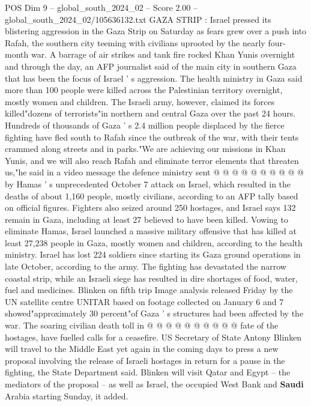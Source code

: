 \begin{textsample}{POS Dim 9 – global\_south\_2024\_02 – Score 2.00 – global\_south\_2024\_02/105636132.txt}  \label{ex:f9_pos_095}
GAZA STRIP : Israel pressed its blistering aggression in the Gaza Strip on Saturday as fears grew over a push into Rafah, the southern city teeming with civilians uprooted by the nearly four-month war.
A barrage of air strikes and tank fire rocked Khan Yunis overnight and through the day, an AFP journalist said of the main city in southern Gaza that has been the focus of Israel ' s aggression.
The health ministry in Gaza said more than 100 people were killed across the Palestinian territory overnight, mostly women and children.
The Israeli army, however, claimed its forces killed"dozens of terrorists"in northern and central Gaza over the past 24 hours.
Hundreds of thousands of Gaza ' s 2.4 million people displaced by the fierce fighting have fled south to Rafah since the outbreak of the war, with their tents crammed along streets and in parks."We are achieving our missions in Khan Yunis, and we will also reach Rafah and eliminate terror elements that threaten us,"he said in a video message the defence ministry sent @ @ @ @ @ @ @ @ @ @ by Hamas ' s unprecedented October 7 attack on Israel, which resulted in the deaths of about 1,160 people, mostly civilians, according to an AFP tally based on official figures.
Fighters also seized around 250 hostages, and Israel says 132 remain in Gaza, including at least 27 believed to have been killed.
Vowing to eliminate Hamas, Israel launched a massive military offensive that has killed at least 27,238 people in Gaza, mostly women and children, according to the health ministry.
Israel has lost 224 soldiers since starting its Gaza ground operations in late October, according to the army.
The fighting has devastated the narrow coastal strip, while an Israeli siege has resulted in dire shortages of food, water, fuel and medicines.
Blinken on fifth trip Image analysis released Friday by the UN satellite centre UNITAR based on footage collected on January 6 and 7 showed"approximately 30 percent"of Gaza ' s structures had been affected by the war.
The soaring civilian death toll in @ @ @ @ @ @ @ @ @ @ fate of the hostages, have fuelled calls for a ceasefire.
US Secretary of State Antony Blinken will travel to the Middle East yet again in the coming days to press a new proposal involving the release of Israeli hostages in return for a pause in the fighting, the State Department said.
Blinken will visit Qatar and Egypt -- the mediators of the proposal -- as well as Israel, the occupied West Bank and \textbf{Saudi} Arabia starting Sunday, it added.

\end{textsample}
